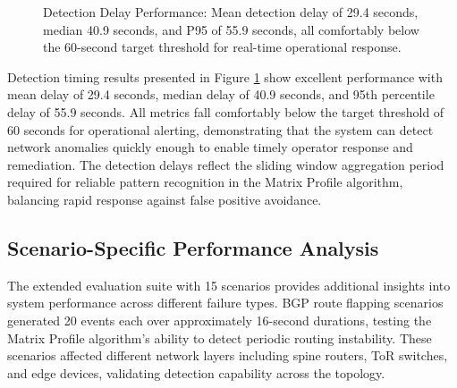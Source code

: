 \documentclass[11pt]{article}
\begin{document}
\begin{figure}[h]
\centering
{}
\caption{Detection Delay Performance: Mean detection delay of 29.4 seconds, median 40.9 seconds, and P95 of 55.9 seconds, all comfortably below the 60-second target threshold for real-time operational response.}
\label{fig:delay}
\end{figure}

Detection timing results presented in Figure \ref{fig:delay} show excellent performance with mean delay of 29.4 seconds, median delay of 40.9 seconds, and 95th percentile delay of 55.9 seconds. All metrics fall comfortably below the target threshold of 60 seconds for operational alerting, demonstrating that the system can detect network anomalies quickly enough to enable timely operator response and remediation. The detection delays reflect the sliding window aggregation period required for reliable pattern recognition in the Matrix Profile algorithm, balancing rapid response against false positive avoidance.

\subsection{Scenario-Specific Performance Analysis}

The extended evaluation suite with 15 scenarios provides additional insights into system performance across different failure types. BGP route flapping scenarios generated 20 events each over approximately 16-second durations, testing the Matrix Profile algorithm's ability to detect periodic routing instability. These scenarios affected different network layers including spine routers, ToR switches, and edge devices, validating detection capability across the topology.
\end{document}
